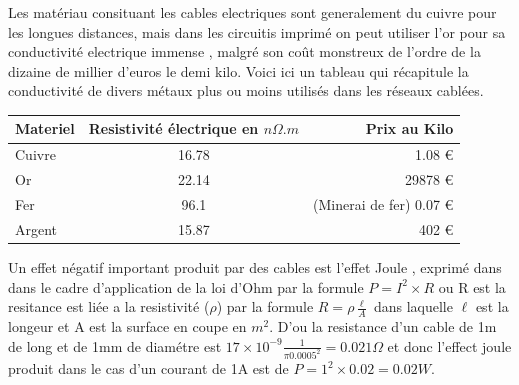 \documentclass[11pt]{report}
\begin{document}
	Les matériau consituant les cables electriques sont generalement du cuivre pour les longues distances, mais dans les circuitis imprimé on peut utiliser l'or pour sa conductivité electrique immense , malgré son coût monstreux de l'ordre de la dizaine de millier d'euros le demi kilo. Voici ici un tableau qui récapitule la conductivité de divers métaux plus ou moins utilisés dans les réseaux cablées.

\begin{center}
\begin{tabular}{| l | c | r |}
	\hline
	Materiel & Resistivité électrique en \( n\Omega .m \)& Prix au Kilo \\
	\hline
	Cuivre & 16.78 & 1.08 \euro{}  \\
	Or & 22.14 & 29878 \euro{}  \\
	Fer & 96.1 & (Minerai de fer) 0.07 \euro{}  \\
	Argent & 15.87 & 402 \euro{}  \\
	\hline
\end{tabular}
\end{center}

	Un effet négatif important produit par des cables est l'effet Joule , exprimé dans dans le cadre d'application de la loi d'Ohm par la formule \( P=I^{2} \times R\) ou R est la resitance est liée a la resistivité (\(\rho\)) par la formule \( R= \rho \frac{\ell}{A} \) dans laquelle \(\ell\) est la longeur et A est la surface en coupe en \(m^2\). D'ou la resistance d'un cable de 1m de long et de 1mm de diamétre est \(17 \times 10^{-9} \frac{1}{\pi 0.0005^{2}} = 0.021 \Omega \) et donc l'effect joule produit dans le cas d'un courant de 1A est de \( P=1^{2} \times 0.02 = 0.02 W\).

\begin{center}
\setlength\fboxsep{0pt}
\setlength\fboxrule{0.5pt}
\end{center}
\end{document}
